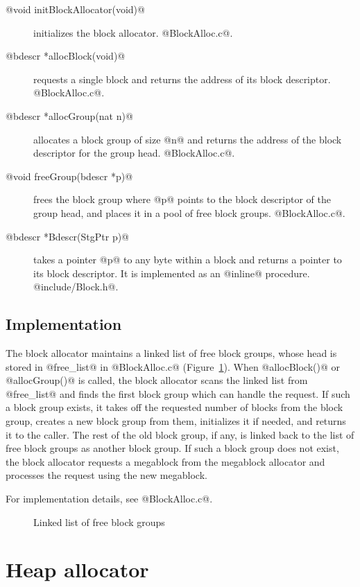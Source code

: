 \documentclass{article}
\begin{document}
\begin{description}
\item[@void initBlockAllocator(void)@] initializes the block allocator. 
@BlockAlloc.c@.
\item[@bdescr *allocBlock(void)@] requests a single block and returns 
the address of its block descriptor. @BlockAlloc.c@.
\item[@bdescr *allocGroup(nat n)@] allocates a block group of size @n@ 
and returns the address of the block descriptor for the group head.
@BlockAlloc.c@.
\item[@void freeGroup(bdescr *p)@] frees the block group where @p@ points
to the block descriptor of the group head, and places it in a pool of
free block groups. @BlockAlloc.c@.
\item[@bdescr *Bdescr(StgPtr p)@] takes a pointer @p@ to any byte within
a block and returns a pointer to its block descriptor. It is implemented as
an @inline@ procedure. @include/Block.h@.
\end{description}

\subsection{Implementation}

The block allocator maintains a linked list of free block groups, whose head
is stored in @free_list@ in @BlockAlloc.c@ (Figure~\ref{fig-freelist}).
When @allocBlock()@ or @allocGroup()@ is called, the block allocator
scans the linked list from @free_list@ and finds the first block group
which can handle the request.
If such a block group exists, it takes off the requested number of blocks
from the block group, creates a new block group from them, 
initializes it if needed, and returns it to the caller. 
The rest of the old block group, if any, is linked back to the list of free block 
groups as another block group. 
If such a block group does not exist, the block allocator requests a megablock
from the megablock allocator and processes the request using the new megablock.

For implementation details, see @BlockAlloc.c@.

\begin{figure}[ht]
\begin{center}

\caption{Linked list of free block groups}
\label{fig-freelist}
\end{center}
\end{figure}

\section{Heap allocator}
\end{document}
